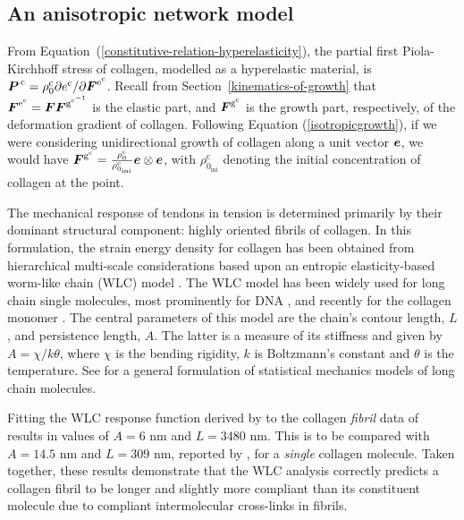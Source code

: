 \subsection{An anisotropic network model}
\label{anisotropic-network-elasticity}

From Equation~(\ref{constitutive-relation-hyperelasticity}), the
partial first Piola-Kirchhoff stress of collagen, modelled as a
hyperelastic material, is $\mbox{\boldmath$ P$}^{\,\mathrm{c}} = \rho_0^\mathrm{c}
\partial e^\mathrm{c}/ \partial\mbox{\boldmath$ F$}^{\mathrm{e}^\mathrm{c}}$. Recall
from Section~\ref{kinematics-of-growth} that
$\mbox{\boldmath$ F$}^{\mathrm{e}^\mathrm{c}} = \mbox{\boldmath$ F$}\mbox{\boldmath$ F$}^{\mathrm{g}^{\mathrm{c}^{-1}}}$
is the elastic part, and $\mbox{\boldmath$ F$}^{\mathrm{g}^\mathrm{c}}$ is the growth
part, respectively, of the deformation gradient of collagen. Following
Equation (\ref{isotropicgrowth}), if we were considering
unidirectional growth of collagen along a unit vector $\mbox{\boldmath$ e$}$, we would
have $\mbox{\boldmath$ F$}^{\mathrm{g}^\mathrm{c}} = \frac{\rho^\mathrm{c}_{0}}
{\rho^\mathrm{c}_{0_{\mathrm{ini}}}} \mbox{\boldmath$ e$} \otimes \mbox{\boldmath$ e$}$, with
$\rho^\mathrm{c}_{0_{\mathrm{ini}}}$ denoting the initial
concentration of collagen at the point.

The mechanical response of tendons in tension is determined primarily
by their dominant structural component: highly oriented fibrils of
collagen. In this formulation, the strain energy density for collagen
has been obtained from hierarchical multi-scale considerations based
upon an entropic elasticity-based worm-like chain (WLC) model
\citep{KratkyPorod:49}. The WLC model has been widely used for long
chain single molecules, most prominently for DNA
\citep{MarkoSiggia:95,Riefetal:97,Bustamanteetal:2003}, and recently
for the collagen mono\-mer \citep{Sunetal:2002}. The central
parameters of this model are the chain's contour length, $L$, and
persistence length, $A$. The latter is a measure of its stiffness and
given by $A = \chi/k\theta$, where $\chi$ is the bending rigidity, $k$
is Boltzmann's constant and $\theta$ is the temperature. See
\citet{LandLif} for a general formulation of statistical mechanics
models of long chain molecules.

Fitting the WLC response function derived by \citet{MarkoSiggia:95} to
the collagen {\em fibril} data of \citet{Grahametal:2004} results in
values of $A = 6$ nm and $L = 3480$ nm. This is to be compared with
$A=14.5$ nm and $L=309$ nm, reported by \citet{Sunetal:2002}, for a
{\em single} collagen molecule. Taken together, these results
demonstrate that the WLC analysis correctly predicts a collagen fibril
to be longer and slightly more compliant than its constituent molecule
due to compliant intermolecular cross-links in fibrils.

